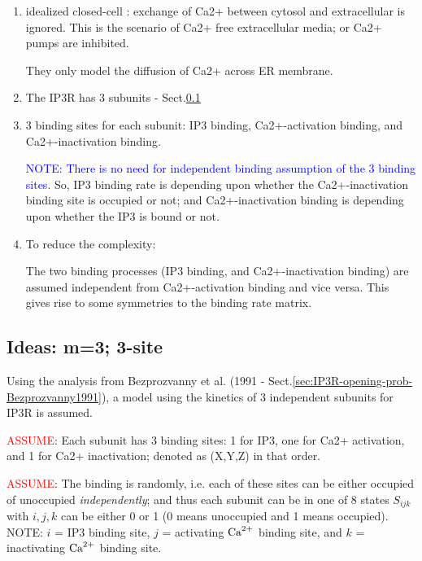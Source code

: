 \begin{enumerate}
  \item idealized closed-cell : exchange of Ca2+ between cytosol and
  extracellular is ignored. This is the scenario of Ca2+ free extracellular
  media; or Ca2+ pumps are inhibited.
  
They only model the diffusion of Ca2+ across ER membrane.

  \item The IP3R has 3 subunits -
  Sect.\ref{sec:ideas}
  
  \item 3 binding sites for each subunit: IP3 binding, Ca2+-activation binding, 
  and Ca2+-inactivation binding.

\textcolor{blue}{NOTE: There is no need for independent binding assumption of
the 3 binding sites}. So, IP3 binding rate is depending upon whether the
Ca2+-inactivation binding site is occupied or not; and Ca2+-inactivation binding
is depending upon whether the IP3 is bound or not.

   \item To reduce the complexity:
   
   The two binding processes (IP3 binding, and Ca2+-inactivation binding) are
   assumed independent from Ca2+-activation binding and vice versa. This gives
   rise to some symmetries to the binding rate matrix.
 
\end{enumerate}


\subsection{Ideas: m=3; 3-site}
\label{sec:ideas}

Using the analysis from Bezprozvanny et al. (1991 -
Sect.\ref{sec:IP3R-opening-prob-Bezprozvanny1991}), a model using the kinetics
of 3 independent subunits for IP3R is assumed.

\textcolor{red}{ASSUME}: Each subunit has 3 binding sites: 1 for IP3, one
for Ca2+ activation, and 1 for Ca2+ inactivation; denoted as (X,Y,Z) in that
order.

\textcolor{red}{ASSUME}: The binding is randomly, i.e. each of these sites can
be either occupied of unoccupied {\it independently}; and thus each subunit can
be in one of 8 states $S_{ijk}$ with $i,j,k$ can be either 0 or 1 (0 means
  unoccupied and 1 means occupied). NOTE: $i$ = IP3 binding site, $j$ =
  activating ${\text{Ca}^{2+}}$ binding site, and $k$ = inactivating ${\text{Ca}^{2+}}$ binding site.

